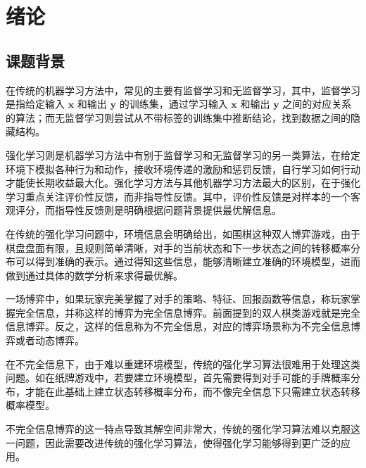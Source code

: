 
\chapter{绪论}
\label{chpt:introduction}

\section{课题背景}

在传统的机器学习方法中，常见的主要有监督学习和无监督学习\cite{goodfellow2016deep}，其中，监督学习是指给定输入 $\boldsymbol{x}$ 和输出 $\boldsymbol{y}$ 的训练集，通过学习输入 $\boldsymbol{x}$ 和输出 $\boldsymbol{y}$ 之间的对应关系的算法；而无监督学习则尝试从不带标签的训练集中推断结论，找到数据之间的隐藏结构\cite{goodfellow2016deep}\cite{bishop2006pattern}\cite{2012statsmethods}。

强化学习则是机器学习方法中有别于监督学习和无监督学习的另一类算法，在给定环境下模拟各种行为和动作，接收环境传递的激励和惩罚反馈，自行学习如何行动才能使长期收益最大化。强化学习方法与其他机器学习方法最大的区别，在于强化学习重点关注评价性反馈，而非指导性反馈。其中，评价性反馈是对样本的一个客观评分，而指导性反馈则是明确根据问题背景提供最优解信息\cite{sutton2018reinforcement}。

在传统的强化学习问题中，环境信息会明确给出，如围棋这种双人博弈游戏，由于棋盘盘面有限，且规则简单清晰，对手的当前状态和下一步状态之间的转移概率分布可以得到准确的表示\cite{silver2017mastering}。通过得知这些信息，能够清晰建立准确的环境模型，进而做到通过具体的数学分析来求得最优解。

一场博弈中，如果玩家完美掌握了对手的策略、特征、回报函数等信息，称玩家掌握{\jiacu 完全信息}，并称这样的博弈为{\jiacu 完全信息博弈}。前面提到的双人棋类游戏就是完全信息博弈\cite{marinatto2000quantum}。反之，这样的信息称为{\jiacu 不完全信息}，对应的博弈场景称为{\jiacu 不完全信息博弈}或者{\jiacu 动态博弈}\cite{marinatto2000quantum}。

在不完全信息下，由于难以重建环境模型，传统的强化学习算法很难用于处理这类问题\cite{macdermed2011markov}。如在纸牌游戏中，若要建立环境模型，首先需要得到对手可能的手牌概率分布，才能在此基础上建立状态转移概率分布，而不像完全信息下只需建立状态转移概率模型。

不完全信息博弈的这一特点导致其解空间非常大\cite{sandholm2010state}，传统的强化学习算法难以克服这一问题，因此需要改进传统的强化学习算法，使得强化学习能够得到更广泛的应用。

